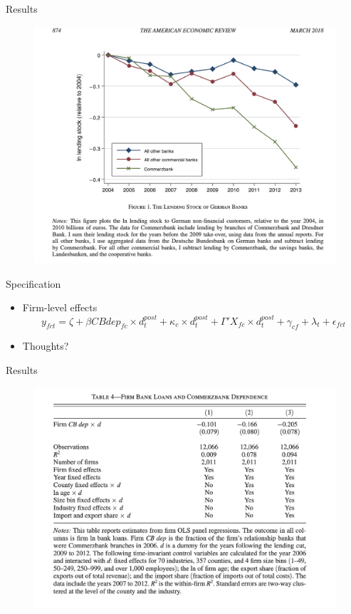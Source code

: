 \documentclass[english,xcolor=svgnames]{beamer}
\begin{document}
\begin{frame}{Results}
\begin{figure}
\includegraphics[scale=0.45]{figures/huber_1}
\end{figure}
\end{frame}


\begin{frame}{Specification}
\begin{itemize}
\item Firm-level effects
\[y_{fct} = \zeta  + \beta CBdep_{fc} \times d^{post}_t +\kappa_c\times d^{post}_t + \Gamma' X_{fc} \times d^{post}_t + \gamma_{cf} + \lambda_t + \epsilon_{fct} \]
\item Thoughts?
\end{itemize}
\end{frame}


\begin{frame}{Results}
\begin{figure}
\includegraphics[scale=0.45]{figures/huber_2}
\end{figure}
\end{frame}
\end{document}

